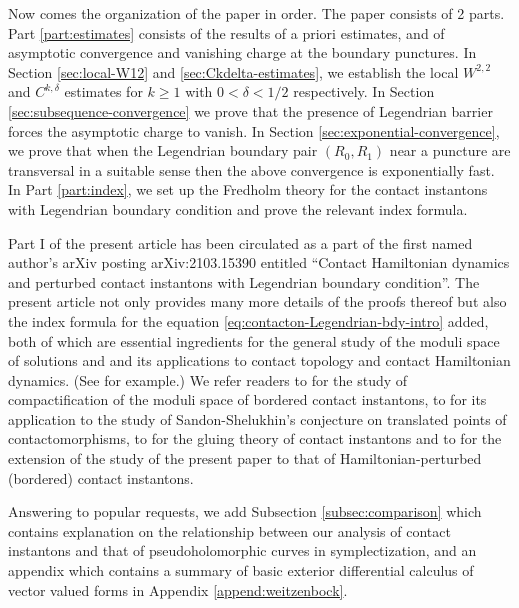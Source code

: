 \documentclass[reqno]{amsart}
\theoremstyle{theorem}
\theoremstyle{definition}
\numberwithin{equation}{section}
\begin{document}
Now comes the organization of the paper in order. The paper consists of 2 parts. Part \ref{part:estimates} consists of the results of a priori estimates, and of asymptotic convergence
and vanishing charge at the boundary punctures.
 In Section \ref{sec:local-W12} and \ref{sec:Ckdelta-estimates},
we establish the local $W^{2,2}$ and $C^{k,\delta}$ estimates for $k \geq 1$ with $0< \delta < 1/2$ respectively.  In Section \ref{sec:subsequence-convergence}
we prove that the presence of Legendrian barrier forces the asymptotic charge to vanish.
In Section \ref{sec:exponential-convergence}, we prove that when the Legendrian boundary
pair $(R_0,R_1)$ near a puncture are transversal in a suitable sense then the above convergence
 is exponentially fast.
In Part \ref{part:index}, we set up the Fredholm theory for the contact instantons with Legendrian boundary condition and prove the relevant index formula.

Part I of the present article has been circulated as a part of the first named author's arXiv
posting arXiv:2103.15390 entitled ``Contact Hamiltonian dynamics
and perturbed contact instantons  with Legendrian boundary
condition''. The present article  not only provides many more details of the proofs
thereof but also the index formula for the equation \eqref{eq:contacton-Legendrian-bdy-intro}
added, both of which are essential ingredients
for the general study of the moduli space of solutions and   and its applications to contact
topology and  contact Hamiltonian dynamics.
(See \cite{oh:entanglement1,oh-yso:spectral,oh:entanglement2} for example.)
We refer readers to
\cite{oh:entanglement1} for the study of compactification of the moduli space of
bordered contact instantons,  to \cite{oh:shelukhin-conjecture}
for its application to the study of Sandon-Shelukhin's conjecture on
translated points of contactomorphisms, to \cite{oh:contacton-transversality} for the gluing theory of
contact instantons and to \cite{oh:perturbed-contacton-bdy} for the extension of the study of
the present paper to that of Hamiltonian-perturbed (bordered) contact instantons.

Answering to popular requests, we add Subsection \ref{subsec:comparison}
which contains explanation on the relationship between
our analysis of contact instantons and that of pseudoholomorphic curves in symplectization,
and an appendix which contains a  summary of basic exterior
 differential calculus  of vector valued forms in Appendix \ref{append:weitzenbock}.
\end{document}

